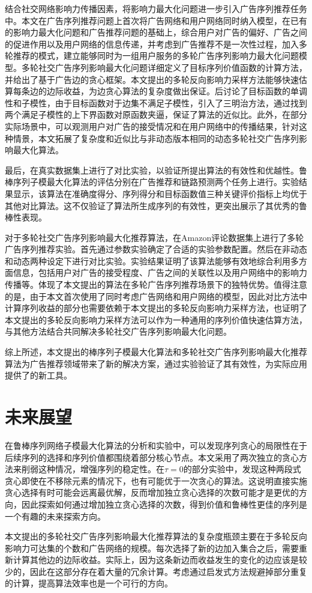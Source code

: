 结合社交网络影响力传播因素，将影响力最大化问题进一步引入广告序列推荐任务中。本文在广告序列推荐问题上首次将广告网络和用户网络同时纳入模型，在已有的影响力最大化问题和广告推荐问题的基础上，综合用户对广告的偏好、广告之间的促进作用以及用户网络的信息传递，并考虑到广告推荐不是一次性过程，加入多轮推荐的模式，建立能够同时为一组用户服务的多轮广告序列影响力最大化问题模型。多轮社交广告序列影响最大化问题详细定义了目标序列价值函数的计算方法，并给出了基于广告边的贪心框架。本文提出的多轮反向影响力采样方法能够快速估算每条边的边际收益，为边贪心算法的复杂度做出保证。后讨论了目标函数的单调性和子模性，由于目标函数对于边集不满足子模性，引入了三明治方法，通过找到两个满足子模性的上下界函数对原函数夹逼，保证了算法的近似比。此外，在部分实际场景中，可以观测用户对广告的接受情况和在用户网络中的传播结果，针对这种情景，本文拓展了复杂度和近似比与非动态版本相同的动态多轮社交广告序列影响最大化算法。

最后，在真实数据集上进行了对比实验，以验证所提出算法的有效性和优越性。鲁棒序列子模最大化算法的评估分别在广告推荐和链路预测两个任务上进行。实验结果显示，该算法在准确度得分、序列得分和目标函数值三种关键评价指标上均优于其他对比算法。这不仅验证了算法所生成序列的有效性，更突出展示了其优秀的鲁棒性表现。

对于多轮社交广告序列影响最大化推荐算法，在Amazon评论数据集上进行了多轮广告序列推荐实验。首先通过参数实验确定了合适的实验参数配置。然后在非动态和动态两种设定下进行对比实验。实验结果证明了该算法能够有效地综合利用多方面信息，包括用户对广告的接受程度、广告之间的关联性以及用户网络中的影响力传播等。体现了本文提出的算法在多轮广告序列推荐场景下的独特优势。值得注意的是，由于本文首次使用了同时考虑广告网络和用户网络的模型，因此对比方法中计算序列收益的部分也需要依赖于本文提出的多轮反向影响力采样方法，也证明了本文提出的多轮反向影响力采样方法可以作为一种通用的序列价值快速估算方法，与其他方法结合共同解决多轮社交广告序列影响最大化问题。

综上所述，本文提出的棒序列子模最大化算法和多轮社交广告序列影响最大化推荐算法为广告推荐领域带来了新的解决方案，通过实验验证了其有效性，为实际应用提供了的新工具。

\section{未来展望}

在鲁棒序列网络子模最大化算法的分析和实验中，可以发现序列贪心的局限性在于后续序列的选择和序列价值都围绕着部分核心节点。本文采用了两次独立的贪心方法来削弱这种情况，增强序列的稳定性。在$\tau=0$的部分实验中，发现这种两段式贪心即使在不移除元素的情况下，也有可能优于一次贪心的算法。这说明直接实施贪心选择有时可能会远离最优解，反而增加独立贪心选择的次数可能才是更优的方向，因此探索如何通过增加独立贪心选择的次数，得到价值和鲁棒性更佳的序列是一个有趣的未来探索方向。

本文提出的多轮社交广告序列影响最大化推荐算法的复杂度瓶颈主要在于多轮反向影响力可达集的个数和广告网络的规模。每次选择了新的边加入集合之后，需要重新计算其他边的边际收益。实际上，因为这条新边而收益发生的变化的边应该是较少的，因此在这部分存在着大量的冗余计算。考虑通过启发式方法规避掉部分重复的计算，提高算法效率也是一个可行的方向。
